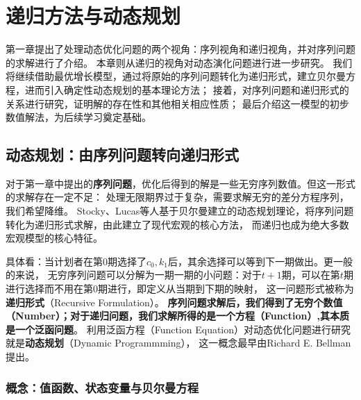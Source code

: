 

\chapter{递归方法与动态规划} \label{ch-ngm-dp}

第一章提出了处理动态优化问题的两个视角：序列视角和递归视角，并对序列问题的求解进行了介绍。
本章则从递归的视角对动态演化问题进行进一步研究。
我们将继续借助最优增长模型，通过将原始的序列问题转化为递归形式，建立贝尔曼方程，进而引入确定性动态规划的基本理论方法；
接着，对序列问题和递归形式的关系进行研究，证明解的存在性和其他相关相应性质；
最后介绍这一模型的初步数值解法，为后续学习奠定基础。


\section{动态规划：由序列问题转向递归形式}  \label{sec-sp-fe}

对于第一章中提出的\textbf{序列问题}，优化后得到的解是一些无穷序列数值。但这一形式的求解存在一定不足：
处理无限期界过于复杂，需要求解无穷的差分方程序列，我们希望降维。
Stocky、Lucas等人基于贝尔曼建立的动态规划理论，将序列问题转化为递归形式求解，由此建立了现代宏观的核心方法，
而递归也成为绝大多数宏观模型的核心特征。

具体看：当计划者在第0期选择了$c_0,k_1$后，其余选择可以等到下一期做出。更一般的来说，
无穷序列问题可以分解为一期一期的小问题：对于$t+1$期，可以在第$t$期进行选择而不用在第0期进行，即定义从当期到下期的映射，
这一问题形式被称为\textbf{递归形式}（Recursive Formulation）。
\textbf{序列问题求解后，我们得到了无穷个数值（Number）；对于递归问题，我们求解所得的是一个方程（Function）,其本质是一个泛函问题}。
利用泛函方程（Function Equation）对动态优化问题进行研究就是\textbf{动态规划}（Dynamic Programmming），
这一概念最早由Richard E. Bellman提出。


\subsection{概念：值函数、状态变量与贝尔曼方程} \label{subsec-dp-concept}

